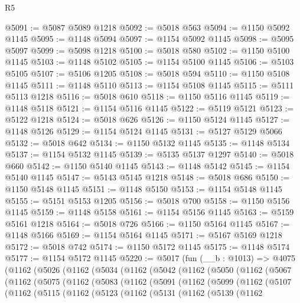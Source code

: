 \begin{lexlean}{R5}
\begin{coremodule}
@5091 := @5087 @5089 @1218
@5092 := @5018 @563
@5094 := @1150 @5092 @1145
@5095 := @1148 @5094
@5097 := @1154 @5092 @1145
@5098 := @5095 @5097
@5099 := @5098 @1218
@5100 := @5018 @580
@5102 := @1150 @5100 @1145
@5103 := @1148 @5102
@5105 := @1154 @5100 @1145
@5106 := @5103 @5105
@5107 := @5106 @1205
@5108 := @5018 @594
@5110 := @1150 @5108 @1145
@5111 := @1148 @5110
@5113 := @1154 @5108 @1145
@5115 := @5111 @5113 @1218
@5116 := @5018 @610
@5118 := @1150 @5116 @1145
@5119 := @1148 @5118
@5121 := @1154 @5116 @1145
@5122 := @5119 @5121
@5123 := @5122 @1218
@5124 := @5018 @626
@5126 := @1150 @5124 @1145
@5127 := @1148 @5126
@5129 := @1154 @5124 @1145
@5131 := @5127 @5129 @5066
@5132 := @5018 @642
@5134 := @1150 @5132 @1145
@5135 := @1148 @5134
@5137 := @1154 @5132 @1145
@5139 := @5135 @5137 @1297
@5140 := @5018 @660
@5142 := @1150 @5140 @1145
@5143 := @1148 @5142
@5145 := @1154 @5140 @1145
@5147 := @5143 @5145 @1218
@5148 := @5018 @686
@5150 := @1150 @5148 @1145
@5151 := @1148 @5150
@5153 := @1154 @5148 @1145
@5155 := @5151 @5153 @1205
@5156 := @5018 @700
@5158 := @1150 @5156 @1145
@5159 := @1148 @5158
@5161 := @1154 @5156 @1145
@5163 := @5159 @5161 @1218
@5164 := @5018 @726
@5166 := @1150 @5164 @1145
@5167 := @1148 @5166
@5169 := @1154 @5164 @1145
@5171 := @5167 @5169 @1218
@5172 := @5018 @742
@5174 := @1150 @5172 @1145
@5175 := @1148 @5174
@5177 := @1154 @5172 @1145
@5220 := @5017
    (fun (__b : @1013) =>
    @4075
      (@1162
        (@5026
          (@1162
            (@5034
              (@1162
                (@5042
                  (@1162
                    (@5050
                      (@1162
                        (@5067
                          (@1162
                            (@5075
                              (@1162
                                (@5083
                                  (@1162
                                    (@5091
                                      (@1162
                                        (@5099
                                          (@1162
                                            (@5107
                                              (@1162
                                                (@5115
                                                  (@1162
                                                    (@5123
                                                      (@1162
                                                        (@5131
                                                          (@1162
                                                            (@5139
                                                              (@1162

\end{coremodule}
\end{lexlean}
